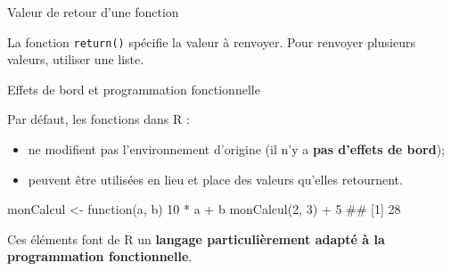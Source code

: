 \documentclass[12pt,handout,ignorenonframetext,]{beamer}
\newenvironment{Shaded}{}{}
\newcommand{\KeywordTok}[1]{\textcolor[rgb]{0.00,0.00,1.00}{{#1}}}
\newcommand{\DataTypeTok}[1]{{#1}}
\newcommand{\DecValTok}[1]{{#1}}
\newcommand{\StringTok}[1]{\textcolor[rgb]{0.00,0.50,0.50}{{#1}}}
\newcommand{\NormalTok}[1]{{#1}}
\providecommand{\tightlist}{%
\setlength{\itemsep}{0pt}\setlength{\parskip}{0pt}}
\renewenvironment{Shaded}{\begin{snugshade}}{\end{snugshade}}
\begin{document}
\begin{frame}[fragile]{Valeur de retour d'une fonction}

La fonction \texttt{return()} spécifie la valeur à renvoyer. Pour
renvoyer plusieurs valeurs, utiliser une liste.

\pause \footnotesize

\begin{Shaded}
\end{Shaded}

\end{frame}

\begin{frame}[fragile]{\large Effets de bord et programmation
fonctionnelle}

Par défaut, les fonctions dans R :

\begin{itemize}
\tightlist
\item
  ne modifient pas l'environnement d'origine (il n'y a \textbf{pas
  d'effets de bord});
\item
  peuvent être utilisées en lieu et place des valeurs qu'elles
  retournent.
\end{itemize}

\begin{Shaded}
\begin{Highlighting}[]
\NormalTok{monCalcul <-}\StringTok{  }\NormalTok{function(a, b) }\DecValTok{10} \NormalTok{*}\StringTok{ }\NormalTok{a +}\StringTok{ }\NormalTok{b}
\KeywordTok{monCalcul}\NormalTok{(}\DecValTok{2}\NormalTok{, }\DecValTok{3}\NormalTok{) +}\StringTok{ }\DecValTok{5}
  \NormalTok{## [1] 28}
\end{Highlighting}
\end{Shaded}

\pause Ces éléments font de R un \textbf{langage particulièrement adapté
à la programmation fonctionnelle}.

\end{frame}
\end{document}
